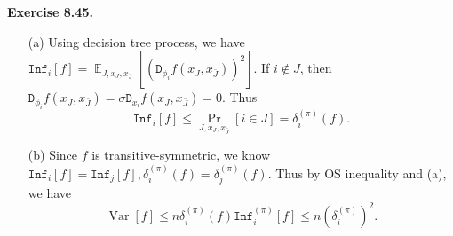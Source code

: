 \documentclass[a4paper]{article}
\newenvironment{exercise}[1]{
	\par
	\noindent\textbf{Exercise #1.}\quad
}{
	\par
	\bigskip
}
\DeclareMathOperator*{\E}{\mathbb E}
\DeclareMathOperator{\Var}{\mathrm{Var}}
\newcommand{\pbra}[1]{{\left( #1 \right)}}
\newcommand{\sbra}[1]{{\left[ #1 \right]}}
\newcommand{\Inf}{\mathtt{Inf}}
\newcommand{\Dtt}{\mathtt{D}}
\begin{document}
\begin{exercise}{8.45}
    \begin{itemize}
        \item[(a)] Using decision tree process, we have 
            $\Inf_i[f]=\E_{J,x_J,x_{\bar J}}\sbra{\pbra{\Dtt_{\phi_i}f(x_J,x_{\bar J})}^2}$.
            If $i\notin J$, then $\Dtt_{\phi_i}f(x_J,x_{\bar J})=\sigma\Dtt_{x_i}f(x_J,x_{\bar J})=0$.
            Thus
            $$
            \Inf_i[f]\leq\Pr_{J,x_J,x_{\bar J}}\sbra{i\in J}=\delta^{(\pi)}_i(f).
            $$
        \item[(b)] Since $f$ is transitive-symmetric, we know $\Inf_i[f]=\Inf_j[f],\delta_i^{(\pi)}(f)=\delta_j^{(\pi)}(f)$.
            Thus by OS inequality and (a), we have
            $$
            \Var[f]\leq n\delta_i^{(\pi)}(f)\Inf_i^{(\pi)}[f]\leq n\pbra{\delta_i^{(\pi)}}^2.
            $$
    \end{itemize}
\end{exercise}
\end{document}
